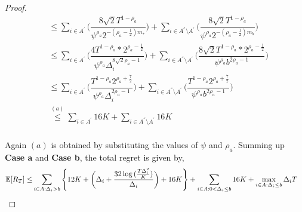 \begin{proof}
\begin{align*}
&\leq\sum_{i\in A^{'}}\bigg(\dfrac{8\sqrt{2}T^{1-\rho_{a}}}{\psi^{\rho_{a}}2^{-(\rho_{a}-\frac{1}{2})m_{*}}} \bigg)+\sum_{i\in A^{''}\setminus A^{'}}\bigg(\dfrac{8\sqrt{2}T^{1-\rho_{a}}}{\psi^{\rho_{a}}2^{-(\rho_{a}-\frac{1}{2})m_{b}}} \bigg)\\
&\leq\sum_{i\in A^{'}}\bigg(\dfrac{4T^{1-\rho_{a}}*2^{\rho_{a}-\frac{1}{2}}}{\psi^{\rho_{a}}\Delta_{i}^{8\sqrt{2}\rho_{a}-1}} \bigg)+\sum_{i\in A^{''}\setminus A^{'}}\bigg(\dfrac{8\sqrt{2}T^{1-\rho_{a}}*2^{\rho_{a}-\frac{1}{2}}}{\psi^{\rho_{a}}b^{2\rho_{a}-1}} \bigg)\\
&\leq\sum_{i\in A^{'}}\bigg(\dfrac{T^{1-\rho_{a}}2^{\rho_{a}+\frac{7}{2}}}{\psi^{\rho_{a}}\Delta_{i}^{2\rho_{a}-1}} \bigg)+\sum_{i\in A^{''}\setminus A^{'}}\bigg(\dfrac{T^{1-\rho_{a}}2^{\rho_{a}+\frac{7}{2}}}{\psi^{\rho_{a}}b^{2\rho_{a}-1}} \bigg)\\
&\overset{(a)}{\leq}\sum_{i\in A^{'}}16K +\sum_{i\in A^{''}\setminus A^{'}} 16K\\
\end{align*}

Again $(a)$ is obtained by substituting the values of $\psi$ and $\rho_a$. Summing up \textbf{Case a} and \textbf{Case b}, the total regret is given by,
\begin{align*}
 \mathbb{E}[R_{T}] \leq &\sum\limits_{i\in A:\Delta_{i} > b} \left\lbrace 12K + \bigg(\Delta_{i}+\dfrac{32\log{(\frac{T\Delta_i^2}{K})}}{\Delta_{i}}\bigg) + 16K\right\rbrace +\sum\limits_{i\in A:0 < \Delta_{i}\leq b} 16K + \max_{i\in A:\Delta_{i}\leq b}\Delta_{i}T
\end{align*}
\end{proof}



